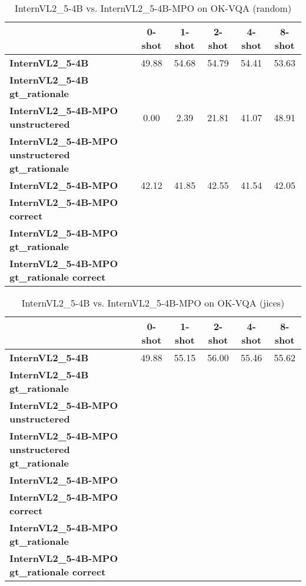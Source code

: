 \begin{table}
\caption{InternVL2\_5-4B vs. InternVL2\_5-4B-MPO on OK-VQA (random)}
\label{tab:InternVL2_5-4B_OK-VQA_TRAIN_random}
\begin{tabular}{lccccc}
\toprule
 & 0-shot & 1-shot & 2-shot & 4-shot & 8-shot \\
\midrule
\textbf{InternVL2\_5-4B} & 49.88 & 54.68 & 54.79 & 54.41 & 53.63 \\
\textbf{InternVL2\_5-4B gt\_rationale} &  &  &  &  &  \\
\textbf{InternVL2\_5-4B-MPO unstructered} & 0.00 & 2.39 & 21.81 & 41.07 & 48.91 \\
\textbf{InternVL2\_5-4B-MPO unstructered gt\_rationale} &  &  &  &  &  \\
\textbf{InternVL2\_5-4B-MPO} & 42.12 & 41.85 & 42.55 & 41.54 & 42.05 \\
\textbf{InternVL2\_5-4B-MPO correct} &  &  &  &  &  \\
\textbf{InternVL2\_5-4B-MPO gt\_rationale} &  &  &  &  &  \\
\textbf{InternVL2\_5-4B-MPO gt\_rationale correct} &  &  &  &  &  \\
\bottomrule
\end{tabular}
\end{table}


\begin{table}
\caption{InternVL2\_5-4B vs. InternVL2\_5-4B-MPO on OK-VQA (jices)}
\label{tab:InternVL2_5-4B_OK-VQA_TRAIN_jices}
\begin{tabular}{lccccc}
\toprule
 & 0-shot & 1-shot & 2-shot & 4-shot & 8-shot \\
\midrule
\textbf{InternVL2\_5-4B} & 49.88 & 55.15 & 56.00 & 55.46 & 55.62 \\
\textbf{InternVL2\_5-4B gt\_rationale} &  &  &  &  &  \\
\textbf{InternVL2\_5-4B-MPO unstructered} &  &  &  &  &  \\
\textbf{InternVL2\_5-4B-MPO unstructered gt\_rationale} &  &  &  &  &  \\
\textbf{InternVL2\_5-4B-MPO} &  &  &  &  &  \\
\textbf{InternVL2\_5-4B-MPO correct} &  &  &  &  &  \\
\textbf{InternVL2\_5-4B-MPO gt\_rationale} &  &  &  &  &  \\
\textbf{InternVL2\_5-4B-MPO gt\_rationale correct} &  &  &  &  &  \\
\bottomrule
\end{tabular}
\end{table}


